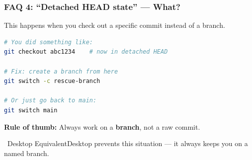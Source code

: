 \documentclass{beamer}
\newcommand{\desktoptip}[1]{\begin{block}{\faMousePointer\ Desktop Equivalent}#1\end{block}}
\begin{document}
\begin{frame}[fragile]
\frametitle{FAQ 4: ``Detached HEAD state'' --- What?}

This happens when you check out a specific commit instead of a branch.

\begin{lstlisting}[language=bash]
# You did something like:
git checkout abc1234    # now in detached HEAD

# Fix: create a branch from here
git switch -c rescue-branch

# Or just go back to main:
git switch main
\end{lstlisting}

\vspace{2mm}
\textbf{Rule of thumb:} Always work on a \textbf{branch}, not a raw commit.

\desktoptip{Desktop prevents this situation --- it always keeps you on a named branch.}
\end{frame}

\end{document}
